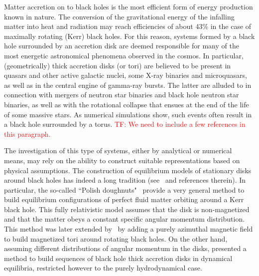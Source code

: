 \documentclass{aa}
\newcommand{\tf}[1]{\textcolor{red}{TF: #1}}
\begin{document}

Matter accretion on to black holes is the most efficient form of energy production known in nature. The conversion of the
gravitational energy of the infalling matter into heat and radiation may reach efficiencies of about 43\% in the case of maximally rotating (Kerr) black holes. For this reason, systems formed by a black hole surrounded by an accretion disk are deemed responsible for many of the most energetic astronomical phenomena observed in the cosmos.
In particular, (geometrically) thick accretion disks (or tori) are believed to be present in quasars and other active galactic nuclei, some 
X-ray binaries and microquasars, as well as in the central engine of gamma-ray bursts.
The latter are alluded to in connection with mergers of neutron star binaries and black hole neutron star binaries, as well as with the rotational collapse that ensues at the end of the life of some massive stars. As numerical simulations show, such events  often result in a black hole surrounded by a torus.
\tf{We need to include a few references in this paragraph.}

The investigation of this type of systems, either by analytical or numerical means, may rely on the ability to construct suitable 
representations based on physical assumptions. The construction of equilibrium models of stationary disks around black holes has indeed a long tradition (see~\cite{Abramowicz:2013} and references therein). In particular, the so-called ``Polish doughnuts"~\citep{Abramowicz:1978,Kozlowski:1978} provide a  very general method to build equilibrium configurations of perfect fluid matter  
 orbiting around a Kerr black hole. This fully relativistic model assumes that the disk is non-magnetized and that the matter obeys a  constant specific angular momentum distribution. This method was later extended by~\cite{Komissarov:2006}  by adding a purely azimuthal magnetic 
 field to build magnetized tori around rotating black holes. On the other hand, assuming different distributions of angular momentum in the disks, \citet{Qian:2009} presented a method to build sequences of black hole thick accretion disks in dynamical equilibria, restricted however to the purely hydrodynamical case. 
 
\end{document}
